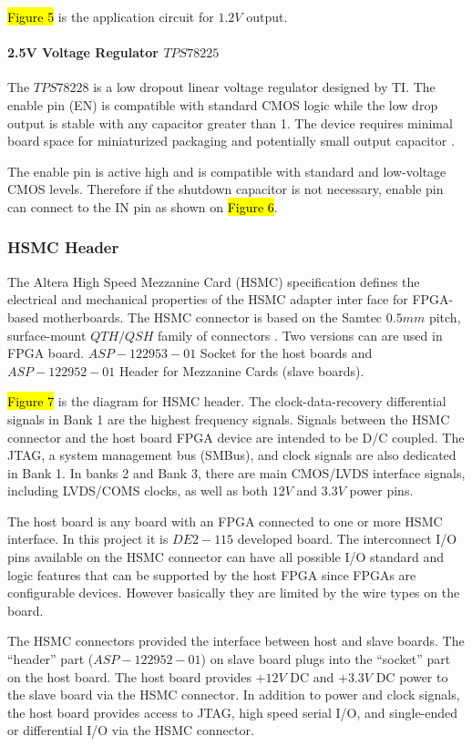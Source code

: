 \hl{Figure 5} is the application circuit for $1.2V$ output.



\paragraph{2.5V Voltage Regulator $TPS78225$}
The $TPS78228$ is a low dropout linear voltage regulator designed by TI. The enable pin (EN) is compatible with standard CMOS logic while the low drop output is stable with any capacitor greater than 1. The device requires minimal board space for miniaturized packaging and potentially small output capacitor \citep{TI:2008:TPS782}.

The enable pin is active high and is compatible with standard and low-voltage CMOS levels. Therefore if the shutdown capacitor is not necessary, enable pin can connect to the IN pin as shown on \hl{Figure 6}.


\subsubsection{HSMC Header}
The Altera High Speed Mezzanine Card (HSMC) specification defines the electrical and mechanical properties of the HSMC adapter inter face for FPGA-based motherboards. The HSMC connector is based on the Samtec $0.5mm$ pitch, surface-mount $QTH/QSH$ family of connectors \citep{Altera:2009:HSMCspec}. Two versions can are used in FPGA board. $ASP-122953-01$ Socket for the host boards and $ASP-122952-01$ Header for Mezzanine Cards (slave boards).

\hl{Figure 7} is the diagram for HSMC header. The clock-data-recovery differential signals in Bank 1 are the highest frequency signals. Signals between the HSMC connector and the host board FPGA device are intended to be D/C coupled. The JTAG, a system management bus (SMBus), and clock signals are also dedicated in Bank 1. In banks 2 and Bank 3, there are main CMOS/LVDS interface signals, including LVDS/COMS clocks, as well as both $12V$ and $3.3V$ power pins.

The host board is any board with an FPGA connected to one or more HSMC interface. In this project it is $DE2-115$ developed board. The interconnect I/O pins available on the HSMC connector can have all possible I/O standard and logic features that can be supported by the host FPGA since FPGAs are configurable devices. However basically they are limited by the wire types on the board.

The HSMC connectors provided the interface between host and slave boards. The ``header'' part ($ASP-122952-01$) on slave board plugs into the ``socket'' part on the host board. The host board provides $+12V$ DC and $+3.3V$ DC power to the slave board via the HSMC connector. In addition to power and clock signals, the host board provides access to JTAG, high speed serial I/O, and single-ended or differential I/O via the HSMC connector.

